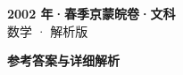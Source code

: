 \documentclass[zihao=-4, a4paper]{ctexart}
\begin{document}
\begin{center}
  {\Large\bfseries 2002 年·春季京蒙皖卷·文科}\\[4pt]
  {\large 数学 · 解析版}
\end{center}
\medskip
{}

\clearpage
{}
\begin{center}{\Large\bfseries 参考答案与详细解析}\end{center}
\medskip

\end{document}
